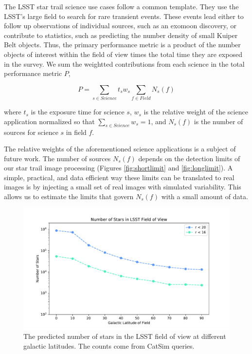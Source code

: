 \documentclass[12pt, letterpaper]{article}
\begin{document}
The LSST star trail science use cases follow a common template. They use the LSST's large field to search for rare transient events. These events lead either to follow up observations of individual sources, such as an exomoon discovery, or contribute to statistics, such as predicting the number density of small Kuiper Belt objects. Thus, the primary performance metric is a product of the number objects of interest within the field of view times the total time they are exposed in the survey. We sum the weightted contributions from each science in the total performance metric $P$,

$$P = \sum_{s \in Science} t_s w_s \sum_{f \in Field} N_s(f)$$

\noindent where $t_{s}$ is the exposure time for science $s$, $w_s$ is the relative weight of the science application normalized so that $\sum_{s \in Science} w_s = 1$, and $N_s(f)$ is the number of sources for science $s$ in field $f$.

The relative weights of the aforementioned science applications is a subject of future work. The number of sources $N_s(f)$ depends on the detection limits of our star trail image processing (Figures \ref{fig:shortlimit} and \ref{fig:longlimit}). A simple, practical, and data efficient way these limits can be translated to real images is by injecting a small set of real images with simulated variability. This allows us to estimate the limits that govern $N_s(f)$ with a small amount of data.

\begin{figure}
\center
\includegraphics[width=0.95\columnwidth]{starcount.pdf}
\caption{The predicted number of stars in the LSST field of view at different galactic latitudes. The counts come from CatSim queries.}
\label{fig:count}
\end{figure}
\end{document}
